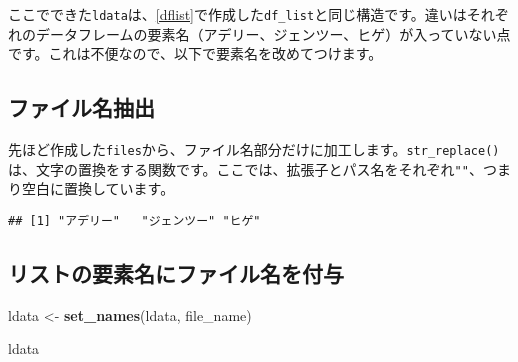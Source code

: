 \documentclass[
  xelatex,ja=standard, b5paper]{bxjsbook}
\newenvironment{Shaded}{\begin{snugshade}}{\end{snugshade}}
\newcommand{\KeywordTok}[1]{\textcolor[rgb]{0.13,0.29,0.53}{\textbf{#1}}}
\newcommand{\NormalTok}[1]{#1}
\newcommand{\OperatorTok}[1]{\textcolor[rgb]{0.81,0.36,0.00}{\textbf{#1}}}
\newcommand{\StringTok}[1]{\textcolor[rgb]{0.31,0.60,0.02}{#1}}
\begin{document}
ここでできた\texttt{ldata}は、\ref{dflist}で作成した\texttt{df\_list}と同じ構造です。違いはそれぞれのデータフレームの要素名（アデリー、ジェンツー、ヒゲ）が入っていない点です。これは不便なので、以下で要素名を改めてつけます。

\hypertarget{ux30d5ux30a1ux30a4ux30ebux540dux62bdux51fa}{%
\subsection{ファイル名抽出}\label{ux30d5ux30a1ux30a4ux30ebux540dux62bdux51fa}}

先ほど作成した\texttt{files}から、ファイル名部分だけに加工します。\texttt{str\_replace()}は、文字の置換をする関数です。ここでは、拡張子とパス名をそれぞれ\texttt{""}、つまり空白に置換しています。

\begin{Shaded}
\end{Shaded}

\begin{verbatim}
## [1] "アデリー"   "ジェンツー" "ヒゲ"
\end{verbatim}

\hypertarget{ux30eaux30b9ux30c8ux306eux8981ux7d20ux540dux306bux30d5ux30a1ux30a4ux30ebux540dux3092ux4ed8ux4e0e}{%
\subsection{リストの要素名にファイル名を付与}\label{ux30eaux30b9ux30c8ux306eux8981ux7d20ux540dux306bux30d5ux30a1ux30a4ux30ebux540dux3092ux4ed8ux4e0e}}

\begin{Shaded}
\begin{Highlighting}[]
\NormalTok{ldata <-}
\StringTok{    }\KeywordTok{set_names}\NormalTok{(ldata, file_name)}

\NormalTok{ldata}
\end{Highlighting}
\end{Shaded}
\end{document}
